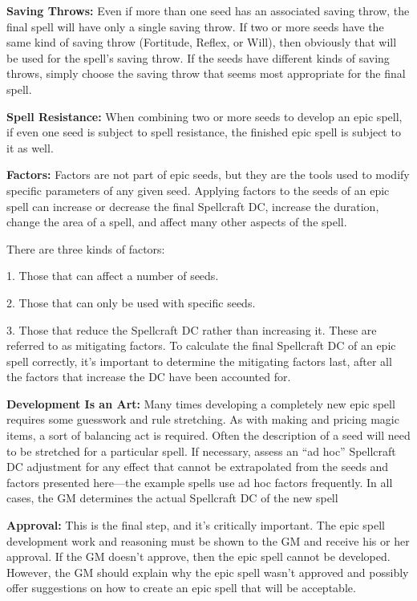 \documentclass{article}
\begin{document}
\textbf{Saving Throws:} Even if more than one seed has an associated saving throw, 
the final spell will have only a single saving throw. If two or more seeds have 
the same kind of saving throw (Fortitude, Reflex, or Will), then obviously that 
will be used for the spell's saving throw. If the seeds have different kinds of 
saving throws, simply choose the saving throw that seems most appropriate for the 
final spell. 

\textbf{Spell Resistance:} When combining two or more seeds to develop an epic 
spell, if even one seed is subject to spell resistance, the finished epic spell 
is subject to it as well. 

\textbf{Factors: }Factors are not part of epic seeds, but they are the tools used 
to modify specific parameters of any given seed. Applying factors to the seeds 
of an epic spell can increase or decrease the final Spellcraft DC, increase the 
duration, change the area of a spell, and affect many other aspects of the spell. 

There are three kinds of factors: 

1. Those that can affect a number of seeds. 

2. Those that can only be used with specific seeds. 

3. Those that reduce the Spellcraft DC rather than increasing it. These are referred 
to as mitigating factors. To calculate the final Spellcraft DC of an epic spell 
correctly, it's important to determine the mitigating factors last, after all the 
factors that increase the DC have been accounted for. 

\textbf{Development Is an Art:} Many times developing a completely new epic spell 
requires some guesswork and rule stretching. As with making and pricing magic items, 
a sort of balancing act is required. Often the description of a seed will need 
to be stretched for a particular spell. If necessary, assess an ``ad hoc'' Spellcraft 
DC adjustment for any effect that cannot be extrapolated from the seeds and factors 
presented here---the example spells use ad hoc factors frequently. In all cases, 
the GM determines the actual Spellcraft DC of the new spell

\textbf{Approval:} This is the final step, and it's critically important. The epic 
spell development work and reasoning must be shown to the GM and receive his or 
her approval. If the GM doesn't approve, then the epic spell cannot be developed. 
However, the GM should explain why the epic spell wasn't approved and possibly 
offer suggestions on how to create an epic spell that will be acceptable. 
\end{document}
